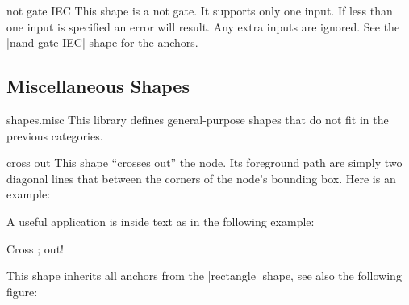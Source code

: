 \begin{shape}{not gate IEC}
  This shape is a not gate. It supports only one input.
  If less than one input is specified an error will result.
  Any extra inputs are ignored. 
  See the |nand gate IEC| shape for the anchors.

\begin{codeexample}[]
\end{codeexample}


\end{shape}






\subsection{Miscellaneous Shapes}

\begin{pgflibrary}{shapes.misc}
  This library defines general-purpose shapes that do not fit in the
  previous categories.
\end{pgflibrary}

\begin{shape}{cross out}
  This shape ``crosses out'' the node. Its foreground path are simply
  two diagonal lines that between the corners of the node's bounding
  box. Here is an example:  
\begin{codeexample}[]
\end{codeexample}

  A useful application is inside text as in the following example:
\begin{codeexample}[]
Cross \tikz[baseline] ; out!  
\end{codeexample}

  This shape inherits all anchors from the |rectangle| shape, see also
  the following figure:
\begin{codeexample}[]
\Huge
{}
\end{codeexample}
\end{shape}


